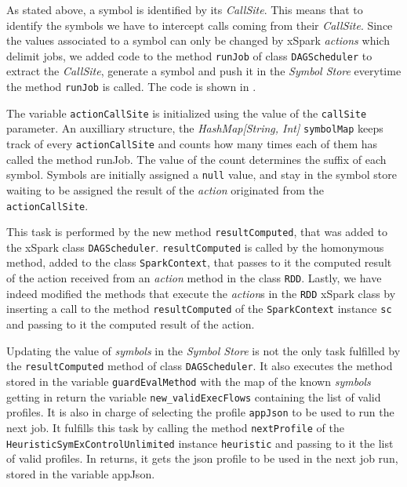 As stated above, a symbol is identified by its \textit{CallSite}. This means that to identify the symbols we have to intercept calls coming from their  \textit{CallSite}. Since the values associated to a symbol can only be changed by xSpark \textit{actions} which delimit jobs, we added code to the method \texttt{runJob} of class \texttt{DAGScheduler} to extract the \textit{CallSite}, generate a symbol and push it in the \textit{Symbol Store} everytime the method \texttt{runJob} is called. The code is shown in . 

The variable \texttt{actionCallSite} is initialized using the value of the \texttt{callSite} parameter.
An auxilliary structure, the \textit{HashMap[String, Int]} \texttt{symbolMap} keeps track of every \texttt{actionCallSite} and counts how many times each of them has called the method runJob. The value of the count determines the suffix of each symbol. Symbols are initially assigned a \texttt{null} value, and stay in the symbol store waiting to be assigned the result of the \textit{action} originated from the \texttt{actionCallSite}. 

This task is performed by the new method \texttt{resultComputed}, that was added to the xSpark class \texttt{DAGScheduler}. \texttt{resultComputed} is called by the homonymous method, added to the class \texttt{SparkContext}, that passes to it the computed result of the action received from an \textit{action} method in the class \texttt{RDD}. 
Lastly, we have indeed modified the methods that execute the \textit{action}s in the \texttt{RDD} xSpark class by inserting a call to the method \texttt{resultComputed} of the \texttt{SparkContext} instance \texttt{sc} and passing to it the computed result of the action. 

Updating the value of \textit{symbols} in the \textit{Symbol Store} is not the only task fulfilled by the \texttt{resultComputed} method of class \texttt{DAGScheduler}. It also executes the method stored in the variable \texttt{guardEvalMethod} with the map of the known \textit{symbols} getting in return the variable \texttt{new\_validExecFlows} containing the list of valid profiles. It is also in charge of selecting the profile \texttt{appJson} to be used to run the next job. It fulfills this task by calling the method \texttt{nextProfile} of the \texttt{HeuristicSymExControlUnlimited} instance \texttt{heuristic} and passing to it the list of valid profiles. In returns, it gets the json profile to be used in the next job run, stored in the variable appJson. 

